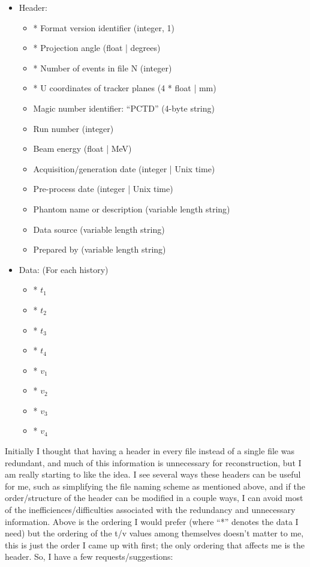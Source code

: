 \documentclass{article}
\begin{document}
\begin{itemize}
    \item Header:
        \begin{itemize}
            \item * Format version identifier (integer, 1)
            \item * Projection angle (float | degrees)
            \item * Number of events in file N (integer)
            \item * U coordinates of tracker planes (4 * float | mm)
            \item Magic number identifier: ``PCTD'' (4-byte string)
            \item Run number (integer)
            \item Beam energy (float | MeV)
            \item Acquisition/generation date (integer | Unix time)
            \item Pre-process date (integer | Unix time)
            \item Phantom name or description (variable length string)
            \item Data source (variable length string)
            \item Prepared by (variable length string)
        \end{itemize}
    \item Data: (For each history)
        \begin{itemize}
            \item * $t_1$
            \item * $t_2$
            \item * $t_3$
            \item * $t_4$
            \item * $v_1$
            \item * $v_2$
            \item * $v_3$
            \item * $v_4$
        \end{itemize}
\end{itemize}

Initially I thought that having a header in every file instead of a single file was redundant, and much of this information is unnecessary for reconstruction, but I am really starting to like the idea.  I see several ways these headers can be useful for me, such as simplifying the file naming scheme as mentioned above, and if the order/structure of the header can be modified in a couple ways, I can avoid most of the inefficiences/difficulties associated with the redundancy and unnecessary information.  Above is the ordering I would prefer (where ``*'' denotes the data I need) but the ordering of the t/v values among themselves doesn't matter to me, this is just the order I came up with first; the only ordering that affects me is the header.  So, I have a few requests/suggestions:
\end{document}
